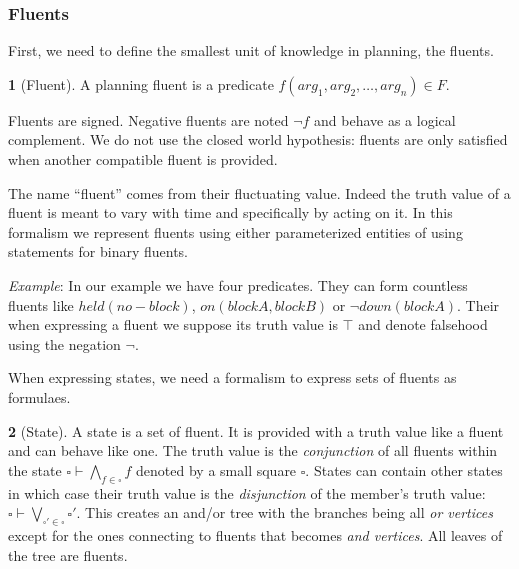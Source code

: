 \documentclass[11pt,a4paper,twoside,openright,titlepage,numbers=noenddot,headinclude,cleardoublepage=empty,openany]{scrreprt}
\theoremstyle{plain}
\theoremstyle{definition}
\newtheorem{definition}{\capitalisewords{definition}}[]
\theoremstyle{remark}
\begin{document}
\hypertarget{fluents}{%
\subsubsection{Fluents}\label{fluents}}

First, we need to define the smallest unit of knowledge in planning, the
fluents.

\begin{definition}[Fluent]

A planning fluent is a predicate \(f(arg_1, arg_2, …, arg_n) \in F\).

Fluents are signed. Negative fluents are noted \(\neg f\) and behave as
a logical complement. We do not use the closed world hypothesis: fluents
are only satisfied when another compatible fluent is provided.

\end{definition}

The name ``fluent'' comes from their fluctuating value. Indeed the truth
value of a fluent is meant to vary with time and specifically by acting
on it. In this formalism we represent fluents using either parameterized
entities of using statements for binary fluents.

\emph{Example}: In our example we have four predicates. They can form
countless fluents like \(held(no-block)\), \(on(blockA, blockB)\) or
\(\neg down(blockA)\). Their when expressing a fluent we suppose its
truth value is \(\top\) and denote falsehood using the negation
\(\neg\).

When expressing states, we need a formalism to express sets of fluents
as formulaes.

\begin{definition}[State]

A state is a set of fluent. It is provided with a truth value like a
fluent and can behave like one. The truth value is the
\emph{conjunction} of all fluents within the state
\(\smwhtsquare \vdash \bigwedge_{f \in \smwhtsquare} f\) denoted by a
small square \(\smwhtsquare\). States can contain other states in which
case their truth value is the \emph{disjunction} of the member's truth
value:
\(\smwhtsquare \vdash \bigvee_{\smwhtsquare' \in \smwhtsquare} \smwhtsquare'\).
This creates an and/or tree with the branches being all \emph{or
vertices} except for the ones connecting to fluents that becomes
\emph{and vertices}. All leaves of the tree are fluents.

\end{definition}
\end{document}
